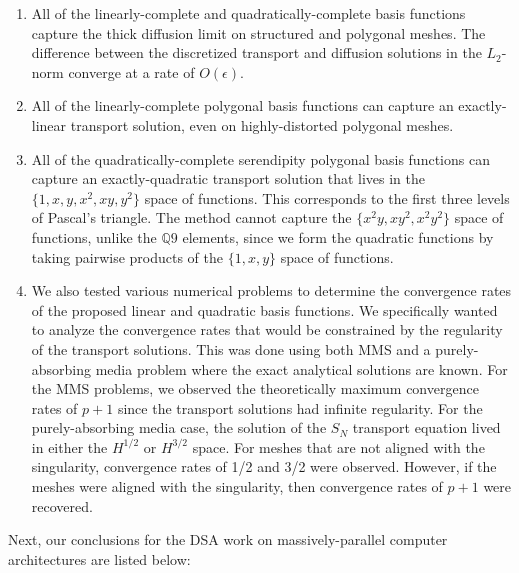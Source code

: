 \begin{enumerate}
\item All of the linearly-complete and quadratically-complete basis functions capture the thick diffusion limit on structured and polygonal meshes. The difference between the discretized transport and diffusion solutions in the $L_2$-norm converge at a rate of $O(\epsilon)$.
\item All of the linearly-complete polygonal basis functions can capture an exactly-linear transport solution, even on highly-distorted polygonal meshes.
\item All of the quadratically-complete serendipity polygonal basis functions can capture an exactly-quadratic transport solution that lives in the $\{ 1,x,y,x^2,xy,y^2\}$ space of functions. This corresponds to the first three levels of Pascal's triangle. The method cannot capture the $\{ x^2y,xy^2,x^2y^2\}$ space of functions, unlike the $\mathbb{Q}9$ elements, since we form the quadratic functions by taking pairwise products of the $\{ 1,x,y\}$ space of functions.
\item We also tested various numerical problems to determine the convergence rates of the proposed linear and quadratic basis functions. We specifically wanted to analyze the convergence rates that would be constrained by the regularity of the transport solutions. This was done using both MMS and a purely-absorbing media problem where the exact analytical solutions are known. For the MMS problems, we observed the theoretically maximum convergence rates of $p+1$ since the transport solutions had infinite regularity. For the purely-absorbing media case, the solution of the $S_N$ transport equation lived in either the $H^{1/2}$ or $H^{3/2}$ space. For meshes that are not aligned with the singularity, convergence rates of 1/2 and 3/2 were observed. However, if the meshes were aligned with the singularity, then convergence rates of $p+1$ were recovered.
\end{enumerate}

Next, our conclusions for the DSA work on massively-parallel computer architectures are listed below:

